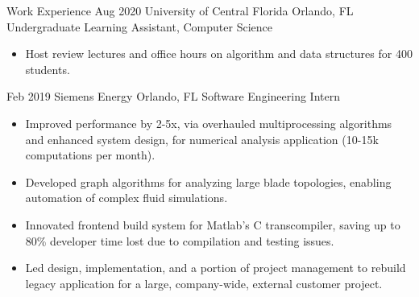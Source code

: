 \documentclass{resume}
\begin{document}
  \begin{fieldlist}{Work Experience}
    \field
      {Aug 2020}
      {University of Central Florida}
      {Orlando, FL}
      {Undergraduate Learning Assistant, Computer Science}
      {
        \begin{itemize}
          \setlength\itemsep{0em}
          \item Host review lectures and office hours on algorithm and data structures for 400 students. 
        \end{itemize}
      }


      \field
        {Feb 2019}
        {Siemens Energy}
        {Orlando, FL}
        {Software Engineering Intern}
        {
          \begin{itemize}
            \setlength\itemsep{0em}
            \item Improved performance by 2-5x, via overhauled multiprocessing algorithms and enhanced system design, for numerical analysis application (10-15k computations per month).
            \item Developed graph algorithms for analyzing large blade topologies, enabling automation of complex fluid simulations.
            \item Innovated frontend build system for Matlab's C transcompiler, saving up to 80\% developer time lost due to compilation and testing issues.
            \item Led design, implementation, and a portion of project management to rebuild legacy application for a large, company-wide, external customer project.
          \end{itemize}
        }

  \end{fieldlist}
\end{document}
